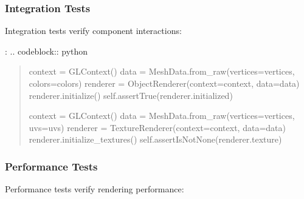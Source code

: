 \documentclass[a4paper,10pt,english,openany,oneside]{sphinxmanual}
\begin{document}
\subsubsection{Integration Tests}
\label{\detokenize{testing:integration-tests}}
\sphinxAtStartPar
Integration tests verify component interactions:

\sphinxAtStartPar
{}:
.. code\sphinxhyphen{}block:: python
\begin{quote}
\begin{description}
\begin{description}
\sphinxAtStartPar
context = GLContext()
data = MeshData.from\_raw(vertices=vertices, colors=colors)
renderer = ObjectRenderer(context=context, data=data)
renderer.initialize()
self.assertTrue(renderer.initialized)

\sphinxAtStartPar
context = GLContext()
data = MeshData.from\_raw(vertices=vertices, uvs=uvs)
renderer = TextureRenderer(context=context, data=data)
renderer.initialize\_textures()
self.assertIsNotNone(renderer.texture)

\end{description}

\end{description}
\end{quote}


\subsubsection{Performance Tests}
\label{\detokenize{testing:performance-tests}}
\sphinxAtStartPar
Performance tests verify rendering performance:
\end{document}
